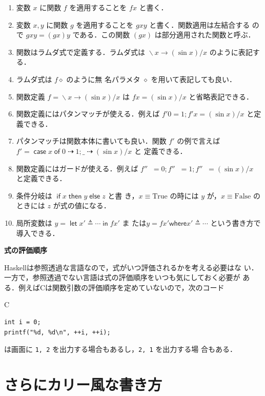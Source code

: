 \documentclass[a5paper,twoside,fleqn,draft]{jsbook}
\newcommand{\programminglanguage}[1]{\textsf{#1}}
\newcommand{\clang}{\programminglanguage{C}}
\newcommand{\haskell}{\programminglanguage{Haskell}}
\newenvironment{note}[1]{\begin{boxnote}\begin{center}\textbf{#1}\end{center}}{\end{boxnote}}
\newcommand{\code}[1]{\texttt{#1}}
\newenvironment{ccode}{\begin{itembox}[r]{\clang}}{\end{itembox}}
\newcommand{\mKeyword}[1]{\mathsf{#1}}
\newcommand{\mIfKeyword}{\mKeyword{if}}
\newcommand{\mCaseKeyword}{\mKeyword{case}}
\newcommand{\mElseKeyword}{\mKeyword{else}}
\newcommand{\mInKeyword}{\mKeyword{in}}
\newcommand{\mLetKeyword}{\mKeyword{let}}
\newcommand{\mOfKeyword}{\mKeyword{of}}
\newcommand{\mOtherwiseKeyword}{\mKeyword{otherwise}}
\newcommand{\mThenKeyword}{\mKeyword{then}}
\newcommand{\mWhereKeyword}{\mKeyword{where}}
\DeclareMathOperator{\mCaseKW}{\mCaseKeyword}
\DeclareMathOperator{\mElse}{\mElseKeyword}
\DeclareMathOperator{\mIf}{\mIfKeyword}
\DeclareMathOperator{\mLet}{\mLetKeyword}
\DeclareMathOperator{\mLetIn}{\mInKeyword}
\DeclareMathOperator{\mOfKW}{\mOfKeyword}
\DeclareMathOperator{\mOtherwise}{\mOtherwiseKeyword}
\DeclareMathOperator{\mThen}{\mThenKeyword}
\newcommand{\mSpecialConstant}[1]{\textrm{#1}}
\newcommand{\mFalse}{\mSpecialConstant{False}}
\newcommand{\mTrue}{\mSpecialConstant{True}}
\newcommand{\mAnonParam}{\diamond}
\DeclareMathOperator{\mIfSo}{\dashrightarrow}
\DeclareMathOperator{\mLambda}{\backslash}
\DeclareMathOperator{\mLambdaArrow}{\rightarrow}
\DeclareMathOperator{\mLetEq}{\triangleq}
\newcommand{\mGuard}[1]{\mathop{\mid_{#1}}}
\newcommand{\mCaseOf}[1]{\mCaseKW#1\mOfKW}
\newcommand{\mIfThenElseEXP}[3]{\mIf{#1}\mThen{#2}\mElse{#3}} %
\newcommand{\mLambdaEXP}[2]{\mLambda{#1}\mLambdaArrow{#2}} %
\newcommand{\mLetInEXP}[3]{\mLet#1\mLetEq#2\mLetIn{#3}} %
\newcommand{\mWhereIsEXP}[2]{\mathbin{\mWhereKeyword}#1\mLetEq#2} %
\begin{document}
\begin{enumerate}
\item 変数 $x$ に関数 $f$ を適用することを $fx$ と書く．\item 変数
  $x,y$ に関数 $g$ を適用することを $gxy$ と書く．関数適用は左結合する
  ので $gxy=(gx)y$ である．この関数 $(gx)$ は部分適用された関数と呼ぶ．
\item 関数はラムダ式で定義する．ラムダ式は $\mLambdaEXP{x}{(\sin
  x)/x}$ のように表記する．\item ラムダ式は $f\mAnonParam$ のように無
  名パラメタ $\mAnonParam$ を用いて表記しても良い．\item 関数定義
  $f=\mLambdaEXP{x}{(\sin x)/x}$ は $fx=(\sin x)/x$ と省略表記できる．
\item 関数定義にはパタンマッチが使える．例えば $f'0=1;f'x=(\sin x)/x$
  と定義できる．\item パタンマッチは関数本体に書いても良い．関数 $f'$
  の例で言えば $f'=\mCaseOf{x}0\mIfSo1;\_\mIfSo(\sin x)/x$ と
  定義できる．\item 関数定義にはガードが使える．例えば
  $f''\mGuard{x<0}=0;f''\mGuard{x\equiv0}=1;f''\mGuard{\mOtherwise}=(\sin
  x)/x$ と定義できる．\item 条件分岐は $\mIfThenElseEXP{x}{y}{z}$ と書
  き，$x\equiv\mTrue$ の時には $y$ が，$x\equiv\mFalse$ のときには $z$
  が式の値になる．\item 局所変数は $y=\mLetInEXP{x'}{\dotsb}{fx'}$ ま
  たは$y=fx'\mWhereIsEXP{x'}{\dotsb}$ という書き方で導入できる．
\end{enumerate}


\begin{note}{式の評価順序}
\haskell は参照透過な言語なので，式がいつ評価されるかを考える必要はな
い．一方で，参照透過でない言語は式の評価順序をいつも気にしておく必要が
ある．例えば\clang は関数引数の評価順序を定めていないので，次のコード
\begin{ccode}
\begin{verbatim}
int i = 0;
printf("%d, %d\n", ++i, ++i);
\end{verbatim}
\end{ccode}
は画面に \code{1, 2} を出力する場合もあるし，\code{2, 1} を出力する場
合もある．
\end{note}

\chapter{さらにカリー風な書き方}
\label{ch:more-curry}
\end{document}
